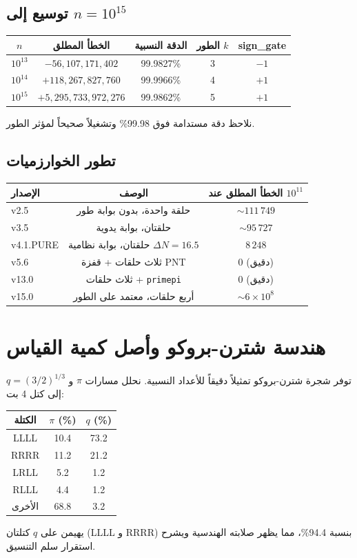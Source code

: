 \documentclass[12pt,a4paper]{article}
\begin{document}
	\subsection{توسيع إلى \(n=10^{15}\)}
	\begin{center}
		\begin{tabular}{c c c c c}
			\toprule
			$n$ & الخطأ المطلق & الدقة النسبية & الطور $k$ & sign\_gate \\
			\midrule
			$10^{13}$ & $-56,107,171,402$ & 99.9827\% & 3 & $-1$ \\
			$10^{14}$ & $+118,267,827,760$ & 99.9966\% & 4 & $+1$ \\
			$10^{15}$ & $+5,295,733,972,276$ & 99.9862\% & 5 & $+1$ \\
			\bottomrule
		\end{tabular}
	\end{center}
	نلاحظ دقة مستدامة فوق 99.98\% وتشغيلاً صحيحاً لمؤثر الطور.
	
	\subsection{تطور الخوارزميات}
	\begin{center}
		\begin{tabular}{l c c}
			\toprule
			الإصدار & الوصف & الخطأ المطلق عند $10^{11}$ \\
			\midrule
			v2.5 & حلقة واحدة، بدون بوابة طور & $\sim 111\,749$ \\
			v3.5 & حلقتان، بوابة يدوية & $\sim 95\,727$ \\
			v4.1.PURE & حلقتان، بوابة نظامية $\Delta N=16.5$ & $8\,248$ \\
			v5.6 & ثلاث حلقات + قفزة PNT & 0 (دقيق) \\
			v13.0 & ثلاث حلقات + \texttt{primepi} & 0 (دقيق) \\
			v15.0 & أربع حلقات، معتمد على الطور & $\sim 6\times10^{8}$ \\
			\bottomrule
		\end{tabular}
	\end{center}
	
	\section{هندسة شترن-بروكو وأصل كمية القياس}
	\label{sec:stern-brocot}
	توفر شجرة شترن-بروكو تمثيلاً دقيقاً للأعداد النسبية. نحلل مسارات $\pi$ و \(q = (3/2)^{1/3}\) إلى كتل 4 بت:
	\begin{center}
		\begin{tabular}{c c c}
			\toprule
			الكتلة & $\pi$ (\%) & $q$ (\%) \\
			\midrule
			LLLL & 10.4 & 73.2 \\
			RRRR & 11.2 & 21.2 \\
			LRLL & 5.2 & 1.2 \\
			RLLL & 4.4 & 1.2 \\
			الأخرى & 68.8 & 3.2 \\
			\bottomrule
		\end{tabular}
	\end{center}
	يهيمن على $q$ كتلتان (LLLL و RRRR) بنسبة 94.4\%، مما يظهر صلابته الهندسية ويشرح استقرار سلم التنسيق.
	
\end{document}
